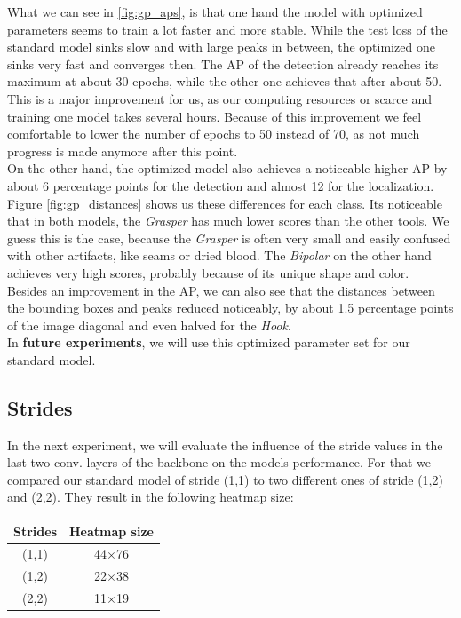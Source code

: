 What we can see in \ref{fig:gp_aps}, is that one hand the model with optimized parameters seems to train a lot faster and more stable. While the test loss of the standard model sinks slow and with large peaks in between, the optimized one sinks very fast and converges then. The AP of the detection already reaches its maximum at about 30 epochs, while the other one achieves that after about 50. This is a major improvement for us, as our computing resources or scarce and training one model takes several hours. Because of this improvement we feel comfortable to lower the number of epochs to 50 instead of 70, as not much progress is made anymore after this point.\\
On the other hand, the optimized model also achieves a noticeable higher AP by about 6 percentage points for the detection and almost 12 for the localization.
Figure \ref{fig:gp_distances} shows us these differences for each class. Its noticeable that in both models, the \emph{Grasper} has much lower scores than the other tools. We guess this is the case, because the \emph{Grasper} is often very small and easily confused with other artifacts, like seams or dried blood. The \emph{Bipolar} on the other hand achieves very high scores, probably because of its unique shape and color.\\ Besides an improvement in the AP, we can also see that the distances between the bounding boxes and peaks reduced noticeably, by about 1.5 percentage points of the image diagonal and even halved for the \emph{Hook}.\\

In \textbf{future experiments}, we will use this optimized parameter set for our standard model.

\FloatBarrier



\subsection{Strides}
In the next experiment, we will evaluate the influence of the stride values in the last two conv. layers of the backbone on the models performance. For that we compared our standard model of stride (1,1) to two different ones of stride (1,2) and (2,2). They result in the following heatmap size:

\begin{center}
	\begin{tabular}{ c | c }
		Strides & Heatmap size\\
		\hline  
		(1,1) & 44$\times$76\\
		(1,2) & 22$\times$38\\
		(2,2) & 11$\times$19\\
	\end{tabular}
\end{center}

